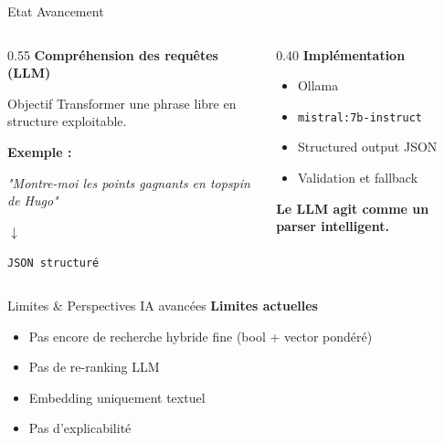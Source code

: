 \documentclass[aspectratio=169, 11pt]{beamer}
\begin{document}
\begin{frame}{Etat Avancement}
    \begin{columns}[T, onlytextwidth]
        \begin{column}{0.55\textwidth}
            \textbf{\large Compréhension des requêtes (LLM)}
            \vspace{0.3cm}
            \begin{block}{Objectif}
                Transformer une phrase libre en structure exploitable.
            \end{block}
            \vspace{0.3cm}
            \textbf{Exemple :}
            \begin{center}
                \textit{"Montre-moi les points gagnants en topspin de Hugo"}
                
                $\downarrow$
                
                \texttt{JSON structuré}
            \end{center}
        \end{column}
        \begin{column}{0.40\textwidth}
            \textbf{\large Implémentation}
            \vspace{0.3cm}
            \begin{itemize}
                \setlength\itemsep{0.5em}
                \item Ollama
                \item \texttt{mistral:7b-instruct}
                \item Structured output JSON
                \item Validation et fallback
            \end{itemize}
            \vspace{0.6cm}
            \textbf{\textrightarrow{} Le LLM agit comme un parser intelligent.}
        \end{column}
    \end{columns}
\end{frame}

\begin{frame}{Limites \& Perspectives IA avancées}
    \textbf{\Large Limites actuelles}
    \vspace{0.6cm}
    \begin{itemize}
        \setlength\itemsep{1.2em}
        \item Pas encore de recherche hybride fine (bool + vector pondéré)
        \item Pas de re-ranking LLM
        \item Embedding uniquement textuel
        \item Pas d'explicabilité
    \end{itemize}
\end{frame}
\end{document}
